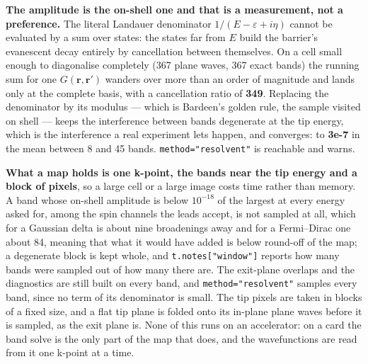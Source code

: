\documentclass[11pt,a4paper]{article}
\newcommand{\code}[1]{\texttt{\small #1}}
\begin{document}
\textbf{The amplitude is the on-shell one and that is a measurement, not a
preference.} The literal Landauer denominator $1/(E - \varepsilon + i\eta)$
cannot be evaluated by a sum over states: the states far from $E$ build the
barrier's evanescent decay entirely by cancellation between themselves. On a
cell small enough to diagonalise completely (367 plane waves, 367 exact bands)
the running sum for one $G(\mathbf r,\mathbf r')$ wanders over more than an
order of magnitude and lands only at the complete basis, with a cancellation
ratio of \textbf{349}. Replacing the denominator by its modulus --- which is
Bardeen's golden rule, the sample visited on shell --- keeps the interference
between bands degenerate at the tip energy, which is the interference a real
experiment lets happen, and converges: to \textbf{3e-7} in the mean between 8
and 45 bands. \code{method="resolvent"} is reachable and warns.

\textbf{What a map holds is one k-point, the bands near the tip energy and a
block of pixels}, so a large cell or a large image costs time rather than
memory. A band whose on-shell amplitude is below $10^{-18}$ of the largest at
every energy asked for, among the spin channels the leads accept, is not
sampled at all, which for a Gaussian delta is
about nine broadenings away and for a Fermi--Dirac one about 84, meaning that
what it would have added is below round-off of the map; a degenerate block is
kept whole, and \code{t.notes["window"]} reports how many bands were sampled
out of how many there are. The exit-plane overlaps and the diagnostics are
still built on every band, and \code{method="resolvent"} samples every band,
since no term of its denominator is small. The tip pixels are taken in blocks
of a fixed size, and a flat tip plane is folded onto its in-plane plane waves
before it is sampled, as the exit plane is. None of this runs on an
accelerator: on a card the band solve is the only part of the map that does,
and the wavefunctions are read from it one k-point at a time.
\end{document}
